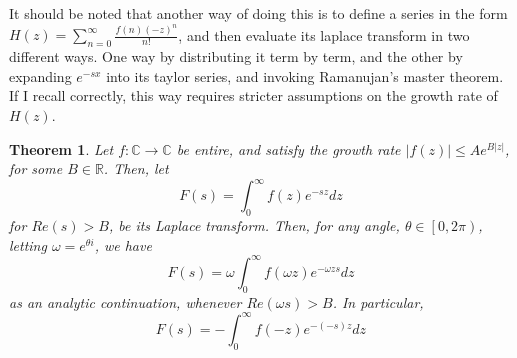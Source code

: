 \documentclass{article}
\newtheorem{theorem}{Theorem}
\begin{document}
	It should be noted that another way of doing this is to define a series in the form $ H(z) = \sum_{n=0}^{\infty} \frac{f(n) (-z)^n}{n!} $, and then evaluate its laplace transform in two different ways. One way by distributing it term by term, and the other by expanding $e^{-sx}$ into its taylor series, and invoking Ramanujan's master theorem. If I recall correctly, this way requires stricter assumptions on the growth rate of $H(z)$. 
	
	\begin{theorem} \label{laplace_analytic_continuation}
		Let $f : \mathbb{C} \rightarrow \mathbb{C}$ be entire, and satisfy the growth rate $|f(z)| \leq A e^{B |z|}$, for some $B \in \mathbb{R}$. Then, let $$F(s) = \int_{0}^{\infty} f(z) e^{-sz} dz$$ for $Re(s) > B$, be its Laplace transform. Then, for any angle, $\theta \in \left[0, 2 \pi \right)$, letting $\omega = e^{\theta i}$, we have $$ F(s) = \omega \int_{0}^{\infty} f(\omega z) e^{-\omega z s} dz $$ as an analytic continuation, whenever $Re(\omega s) > B$. In particular, $$ F(s) = -\int_{0}^{\infty} f(-z) e^{-(-s)z} dz $$
	\end{theorem}
\end{document}

